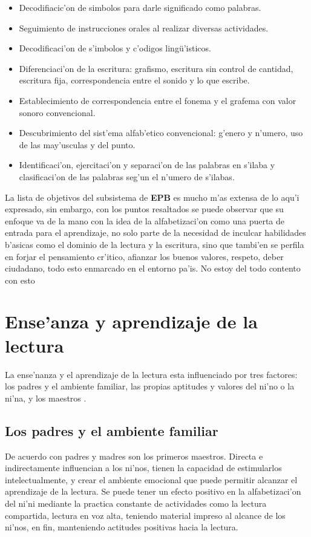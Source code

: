 \begin{itemize}
	\item Decodifiacic'on de simbolos para darle significado como palabras.
	\item Seguimiento de instrucciones orales al realizar diversas actividades.
	\item Decodificaci'on de s'imbolos y c'odigos ling\"{u}'isticos.
	\item Diferenciaci'on de la escritura: grafismo, escritura sin control de cantidad, escritura fija, correspondencia entre el sonido y lo que escribe.
	\item Establecimiento de correspondencia entre el fonema y el grafema con valor sonoro convencional.
	\item Descubrimiento del sist'ema alfab'etico convencional: g'enero y n'umero, uso de las may'usculas y del punto.
	\item Identificaci'on, ejercitaci'on y separaci'on de las palabras en s'ilaba y clasificaci'on de las palabras seg'un el n'umero de s'ilabas.
\end{itemize}

La lista de objetivos del subsistema de \textbf{EPB} es mucho m'as extensa de lo aqu'i expresado, sin embargo, con los puntos resaltados se puede observar que su enfoque va de la mano con la idea de la alfabetizaci'on como una puerta de entrada para el aprendizaje, no solo parte de la necesidad de inculcar habilidades b'asicas como el dominio de la lectura y la escritura, sino que tambi'en se perfila en forjar el pensamiento cr'itico, afianzar los buenos valores, respeto, deber ciudadano, todo esto enmarcado en el entorno pa'is. {\color{red} No estoy del todo contento con esto}


\section{Ense'anza y aprendizaje de la lectura}
La ense'nanza y el aprendizaje de la lectura esta influenciado por tres factores: los padres y el ambiente familiar, las propias aptitudes y valores del ni'no o la ni'na, y los maestros \cite{NNamdi}. 

\subsection{Los padres y el ambiente familiar}
De acuerdo con \cite{Morrow} padres y madres son los primeros maestros. Directa e indirectamente influencian a los ni'nos, tienen la capacidad de estimularlos intelectualmente, y crear el ambiente emocional que puede permitir alcanzar el aprendizaje de la lectura. Se puede tener un efecto positivo en la alfabetizaci'on del ni'ni mediante la practica constante de actividades como la lectura compartida, lectura en voz alta, teniendo material impreso al alcance de los ni'nos, en fin, manteniendo actitudes positivas hacia la lectura.

